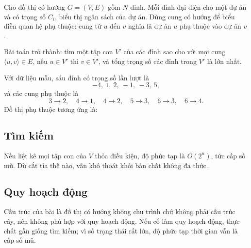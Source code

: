\documentclass[11pt]{article}
\begin{document}
Cho đồ thị có hướng \(G=(V,E)\) gồm \(N\) đỉnh. Mỗi đỉnh đại diện cho một dự
án và có trọng số \(C_i\), biểu thị ngân sách của dự án. Dùng cung có hướng để
biểu diễn quan hệ phụ thuộc: cung từ \(u\) đến \(v\) nghĩa là dự án \(u\) phụ
thuộc vào dự án \(v\).

Bài toán trở thành: tìm một tập con \(V'\) của các đỉnh sao cho với mọi cung
\(\langle u,v\rangle\in E\), nếu \(u\in V'\) thì \(v\in V'\), và tổng trọng số
các đỉnh trong \(V'\) là lớn nhất.

Với dữ liệu mẫu, sáu đỉnh có trọng số lần lượt là
\[
  -4,\ 1,\ 2,\ -1,\ -3,\ 5,
\]
và các cung phụ thuộc là
\[
  3\to2,\quad 4\to1,\quad 4\to2,\quad 5\to3,\quad 6\to3,\quad 6\to4.
\]
Đồ thị phụ thuộc tương ứng là:

\begin{center}
\end{center}

\subsection{Tìm kiếm}

Nếu liệt kê mọi tập con của \(V\) thỏa điều kiện, độ phức tạp là \(O(2^n)\),
tức cấp số mũ. Dù cắt tỉa thế nào, vẫn khó thoát khỏi bản chất không đa thức.

\subsection{Quy hoạch động}

Cấu trúc của bài là đồ thị có hướng không chu trình chứ không phải cấu trúc
cây, nên không phù hợp với quy hoạch động. Nếu cố làm quy hoạch động, thực
chất gần giống tìm kiếm; vì số trạng thái rất lớn, độ phức tạp thời gian vẫn
là cấp số mũ.
\end{document}
